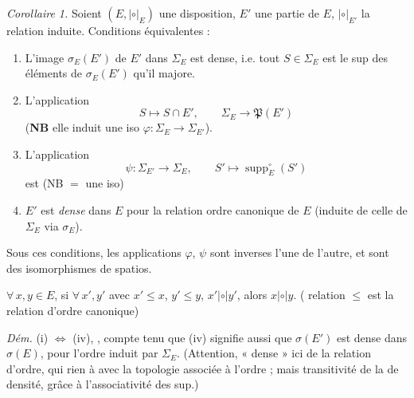 \documentclass[11pt,a4paper]{article}
\begin{document}
\emph{Corollaire 1.} Soient $(E, \mathrel{|\circ|}_E)$ une disposition, $E'$ une partie de $E$, $\mathrel{|\circ|}_{E'}$ la relation induite. Conditions équivalentes :
\begin{enumerate}
  \item[(i)] L'image $\sigma_E(E')$ de $E'$ dans $\Sigma_E$ est dense, i.e. tout $S \in \Sigma_E$ est le sup des éléments de $\sigma_E(E')$ qu'il majore.
  \item[(ii)] \struck{\ill{}} L'application
  \[
    S \longmapsto S \cap E' , \qquad \Sigma_E \longrightarrow \mathfrak{P}(E')
  \]
     (\textbf{NB} elle induit  une iso $\varphi : \Sigma_E \to \Sigma_{E'}$). 
  \item[(iii)] L'application
  \[
    \psi : \Sigma_{E'} \longrightarrow \Sigma_E , \qquad S' \longmapsto \operatorname{supp}^{\circ}_E(S')
  \]
  est  (NB  $=$ une iso)
  \item[(iv)] $E'$ est \emph{dense} dans $E$ pour la relation ordre canonique de $E$ (induite de celle de $\Sigma_E$ via $\sigma_E$).
\end{enumerate}


Sous ces conditions, les applications $\varphi$, $\psi$ sont inverses l'une de l'autre, et sont des isomorphismes de spatios.

 $\forall\, x, y \in E$, si $\forall\, x', y'$ avec $x' \leq x$, $y' \leq y$,  $x' \mathrel{|\circ|} y'$, alors $x \mathrel{|\circ|} y$. ( relation $\leq$ est la relation d'ordre canonique)

\emph{Dém.} (i) $\iff$ (iv), , compte tenu que (iv) signifie aussi que $\sigma(E')$ est dense dans $\sigma(E)$, pour l'ordre induit par $\Sigma_E$. (Attention, « dense » ici  de la relation d'ordre, qui   rien à  avec la topologie associée à l'ordre ; mais  transitivité de la  de densité, grâce à l'associativité des sup.)
\end{document}
